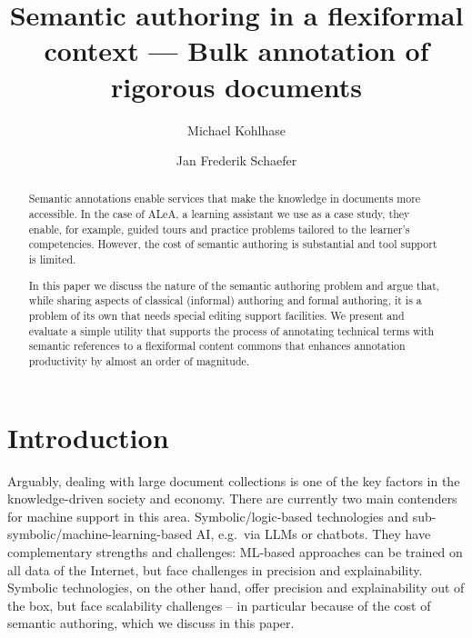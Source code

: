 \documentclass[runningheads]{llncs}
\title{
Semantic authoring in a flexiformal context --- Bulk annotation of rigorous documents
}
\author{Michael Kohlhase\orcidlink{0000-0002-9859-6337} \and Jan Frederik Schaefer\orcidlink{0000-0003-2545-4626}}
\institute{Computer Science, FAU Erlangen N\"urnberg, Germany}
\newcommand\ALeA{\textsf{ALeA}\xspace}
\begin{document}
\maketitle
\begin{abstract}
% 

  Semantic annotations enable services that make the knowledge in documents more
  accessible.  In the case of \ALeA, a learning assistant we use as a case study, they
  enable, for example, guided tours and practice problems tailored to the learner's
  competencies.  However, the cost of semantic authoring is substantial and tool support
  is limited.

  In this paper we discuss the nature of the semantic authoring problem and argue that,
  while sharing aspects of classical (informal) authoring and formal authoring, it is a
  problem of its own that needs special editing support facilities.  We present and
  evaluate a simple utility that supports the process of annotating technical terms with
  semantic references to a flexiformal content commons that enhances annotation
  productivity by almost an order of magnitude.
\end{abstract}

\section{Introduction}
Arguably, dealing with large document collections is one of the key factors in the knowledge-driven society and economy.
There are currently two main contenders for machine support in this area.
Symbolic/logic-based technologies and sub-symbolic/machine-learning-based AI, e.g.\ via LLMs or chatbots.
They have complementary strengths and challenges:
ML-based approaches can be trained on all data of the Internet, but face challenges in precision and explainability. 
Symbolic technologies, on the other hand, offer precision and explainability out of the box, but face scalability challenges
-- in particular because of the cost of semantic authoring, which we discuss in this paper.
\end{document}
